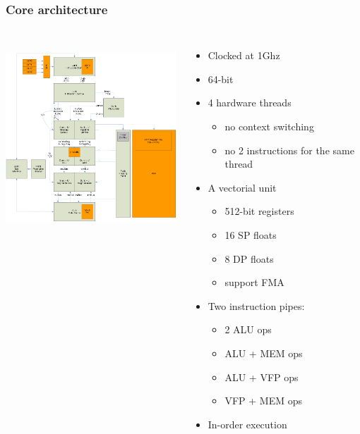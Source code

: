 \documentclass{beamer}
\begin{document}
\begin{frame}
\end{frame}

\begin{frame}
  \frametitle{Core architecture}
  \begin{columns}
    \column{20em}
    \includegraphics[width=20em,height=20em]{slides-figures/MIC-core.png}%
    \column{12em}
    \begin{itemize}
      \small
    \item Clocked at 1Ghz
    \item 64-bit
    \item 4 hardware threads
      \begin{itemize}
        \footnotesize
        \item no context switching
        \item no 2 instructions for the same thread
      \end{itemize}
    \item A vectorial unit
      \begin{itemize}
        \footnotesize
        \item 512-bit registers
        \item 16 SP floats
        \item 8 DP floats
        \item support FMA
      \end{itemize}
    \item Two instruction pipes:
      \begin{itemize}
        \footnotesize
        \item 2 ALU ops
        \item ALU + MEM ops
        \item ALU + VFP ops
        \item VFP + MEM ops
      \end{itemize}
    \item In-order execution
    \end{itemize}
  \end{columns}
\end{frame}
\end{document}

